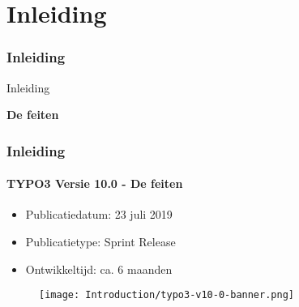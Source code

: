 %

\section{Inleiding}
\begin{frame}[fragile]
	\frametitle{Inleiding}

	\begin{center}\huge{Inleiding}\end{center}
	\begin{center}\huge{\color{typo3darkgrey}\textbf{De feiten}}\end{center}

\end{frame}


\begin{frame}[fragile]
	\frametitle{Inleiding}
	\framesubtitle{TYPO3 Versie 10.0 - De feiten}

	\begin{itemize}
		\item Publicatiedatum: 23 juli 2019
		\item Publicatietype: Sprint Release
		\item Ontwikkeltijd: ca. 6 maanden
	\end{itemize}

	\begin{figure}
		\texttt{[image: Introduction/typo3-v10-0-banner.png]}
	\end{figure}

\end{frame}


